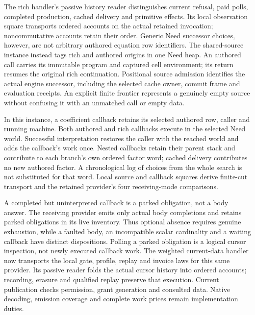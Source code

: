 \documentclass[11pt]{article}
\theoremstyle{definition}
\theoremstyle{remark}
\begin{document}
The rich handler's passive history reader distinguishes current refusal,
paid polls, completed production, cached delivery and primitive effects.
Its local observation square transports ordered accounts on the actual
retained invocation; noncommutative accounts retain their order. Generic
Need successor choices, however, are not arbitrary authored equation row
identifiers. The shared-source instance instead tags rich and authored
origins in one Need heap. An authored call carries its immutable program
and captured cell environment; its return resumes the original rich
continuation. Positional source admission identifies the actual engine
successor, including the selected cache owner, commit frame and evaluation
receipts. An explicit finite frontier represents a genuinely empty source
without confusing it with an unmatched call or empty data.

In this instance, a coefficient callback retains its selected authored row,
caller and running machine. Both authored and rich callbacks execute in
the selected Need world. Successful interpretation restores the caller
with the reached world and adds the callback's work once. Nested callbacks
retain their parent stack and contribute to each branch's own ordered
factor word; cached delivery contributes no new authored factor. A
chronological log of choices from the whole search is not substituted for
that word. Local source and callback squares derive finite-cut transport
and the retained provider's four receiving-mode comparisons.

A completed but uninterpreted callback is a parked obligation, not a body
answer. The receiving provider emits only actual body completions and
retains parked obligations in its live inventory. Thus optional absence
requires genuine exhaustion, while a faulted body, an incompatible scalar
cardinality and a waiting callback have distinct dispositions. Polling a
parked obligation is a logical cursor inspection, not newly executed
callback work. The weighted current-data handler now transports the local
gate, profile, replay and invoice laws for this same provider. Its passive
reader folds the actual cursor history into ordered accounts; recording,
erasure and qualified replay preserve that execution. Current publication
checks permission, grant generation and consulted data. Native decoding,
emission coverage and complete work prices remain implementation duties.
\end{document}
